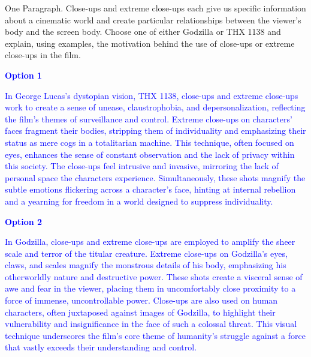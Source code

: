 \documentclass[11pt,fleqn]{book}
\begin{document}
\begin{exercise}
    One Paragraph. Close-ups and extreme close-ups each give us specific information about a cinematic world and create particular relationships between the viewer’s body and the screen body. Choose one of either Godzilla or THX 1138 and explain, using examples, the motivation behind the use of close-ups or extreme close-ups in the film.

    \textcolor{blue}{
\textbf{Option 1}
}

    \textcolor{blue}{
In George Lucas's dystopian vision, THX 1138, close-ups and extreme close-ups work to create a sense of unease, claustrophobia, and depersonalization, reflecting the film's themes of surveillance and control. Extreme close-ups on characters' faces fragment their bodies, stripping them of individuality and emphasizing their status as mere cogs in a totalitarian machine.  This technique, often focused on eyes, enhances the sense of constant observation and the lack of privacy within this society. The close-ups feel intrusive and invasive, mirroring the lack of personal space the characters experience.  Simultaneously, these shots magnify the subtle emotions flickering across a character's face, hinting at  internal rebellion and a yearning for freedom in a world designed to suppress individuality.
}

\textcolor{blue}{
\textbf{Option 2}
}

\textcolor{blue}{
In Godzilla, close-ups and extreme close-ups are employed to amplify the sheer scale and terror of the titular creature. Extreme close-ups on Godzilla's eyes, claws, and scales magnify the monstrous details of his body, emphasizing his otherworldly nature and destructive power. These shots create a visceral sense of awe and  fear in the viewer, placing them in uncomfortably close proximity to a force of immense, uncontrollable power. Close-ups are also used on human characters, often juxtaposed against images of Godzilla, to highlight their vulnerability and insignificance in the face of such a colossal threat.  This visual technique underscores the film's core theme of humanity's struggle against a force that vastly exceeds their understanding and control.}
\end{exercise}
\end{document}
